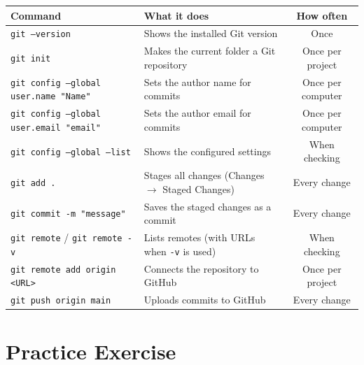 \documentclass[11pt,a4paper]{article}
\newcommand{\code}[1]{\texttt{#1}}
\begin{document}
\begin{center}
\renewcommand{\arraystretch}{1.35}
\small
\begin{tabularx}{\linewidth}{|p{6.4cm}|X|c|}
\hline
\textbf{Command} & \textbf{What it does} & \textbf{How often} \\ \hline
\code{git --version} & Shows the installed Git version & Once \\ \hline
\code{git init} & Makes the current folder a Git repository & Once per project \\ \hline
\code{git config --global user.name "Name"} & Sets the author name for commits & Once per computer \\ \hline
\code{git config --global user.email "email"} & Sets the author email for commits & Once per computer \\ \hline
\code{git config --global --list} & Shows the configured settings & When checking \\ \hline
\code{git add .} & Stages all changes (Changes $\rightarrow$ Staged Changes) & Every change \\ \hline
\code{git commit -m "message"} & Saves the staged changes as a commit & Every change \\ \hline
\code{git remote} / \code{git remote -v} & Lists remotes (with URLs when \code{-v} is used) & When checking \\ \hline
\code{git remote add origin <URL>} & Connects the repository to GitHub & Once per project \\ \hline
\code{git push origin main} & Uploads commits to GitHub & Every change \\ \hline
\end{tabularx}
\end{center}

\section{Practice Exercise}
\end{document}
